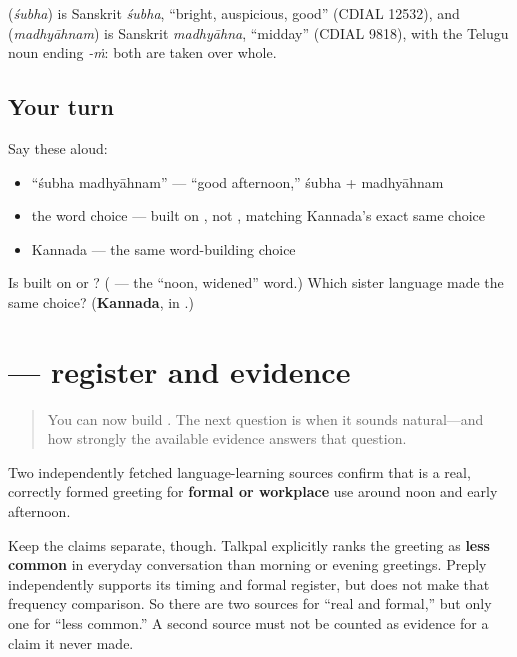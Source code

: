 \begin{cousinweb}
\textbf{} (\emph{śubha}) is Sanskrit \emph{śubha}, \textquotedblleft{}bright, auspicious, good\textquotedblright{} (CDIAL 12532), and \textbf{} (\emph{madhyāhnam}) is Sanskrit \emph{madhyāhna}, \textquotedblleft{}midday\textquotedblright{} (CDIAL 9818), with the Telugu noun ending \emph{-ṁ}: both are taken over whole.
\end{cousinweb}

\subsection*{Your turn}
Say these aloud:

\begin{itemize}
\raggedright
  \item \textquotedblleft{}śubha madhyāhnam\textquotedblright{} — \textquotedblleft{}good afternoon,\textquotedblright{} śubha + madhyāhnam
  \item the word choice — built on , not , matching Kannada's exact same choice
  \item Kannada \textbf{ } — the same word-building choice
\end{itemize}

\begin{tcolorbox}[breakable,colback=teal!4,colframe=teal!35!black,title={Before you move on}]
Is   built on  or ? (\textbf{} — the “noon, widened” word.) Which sister language made the same choice? (\textbf{Kannada}, in  .)
\end{tcolorbox}
\section[\texorpdfstring{\te{శుభ} \te{మధ్యాహ్నం} — register (śubha madhyāhnam)}{శుభ మధ్యాహ్నం — register (śubha madhyāhnam)}]{  — register and evidence}

\label{lesson:TE-C31-subha-madhyahnam-register}



\begin{quote}
You can now build \textbf{ }. The next question is when it sounds natural—and how strongly the available evidence answers that question.
\end{quote}

\begin{culture}
Two independently fetched language-learning sources confirm that \textbf{ } is a real, correctly formed greeting for \textbf{formal or workplace} use around noon and early afternoon.

Keep the claims separate, though. Talkpal explicitly ranks the greeting as \textbf{less common} in everyday conversation than morning or evening greetings. Preply independently supports its timing and formal register, but does not make that frequency comparison. So there are two sources for “real and formal,” but only one for “less common.” A second source must not be counted as evidence for a claim it never made.
\end{culture}

